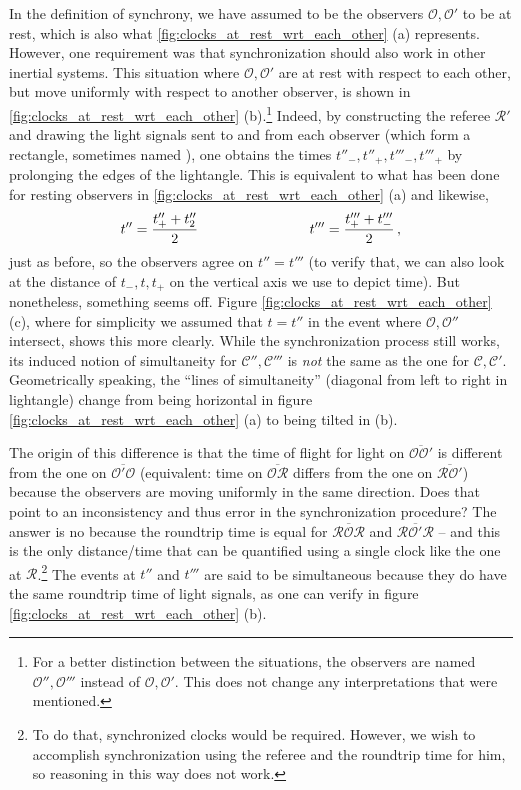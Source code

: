 In the definition of synchrony, we have assumed to be the observers $\mathcal{O}, \mathcal{O}'$ to be at rest, which is also what \ref{fig:clocks_at_rest_wrt_each_other} (a) represents. However, one requirement was that synchronization should also work in other inertial systems. This situation where $\mathcal{O}, \mathcal{O}'$ are at rest with respect to each other, but move uniformly with respect to another observer, is shown in \ref{fig:clocks_at_rest_wrt_each_other} (b).\footnote{For a better distinction between the situations, the observers are named $\mathcal{O}'', \mathcal{O}'''$ instead of $\mathcal{O}, \mathcal{O}'$. This does not change any interpretations that were mentioned.} Indeed, by constructing the referee $\mathcal{R}'$ and drawing the light signals sent to and from each observer (which form a rectangle, sometimes named ), one obtains the times $t''_-, t''_+, t'''_-, t'''_+$ by prolonging the edges of the lightangle. This is equivalent to what has been done for resting observers in \ref{fig:clocks_at_rest_wrt_each_other} (a) and likewise,
\begin{equation}
	t'' = \frac{t''_+ + t''_2}{2}
	\qquad \qquad \qquad \qquad
	t''' = \frac{t'''_+ + t'''_-}{2}
	\, ,
\end{equation}
just as before, so the observers agree on $ t'' = t'''$ (to verify that, we can also look at the distance of $t_-, t, t_+$ on the vertical axis we use to depict time). But nonetheless, something seems off. Figure \ref{fig:clocks_at_rest_wrt_each_other} (c), where for simplicity we assumed that $t = t''$ in the event where $\mathcal{O}, \mathcal{O}''$ intersect, shows this more clearly. While the synchronization process still works, its induced notion of simultaneity for $\mathcal{C}'', \mathcal{C}'''$ is \emph{not} the same as the one for $\mathcal{C}, \mathcal{C}'$. Geometrically speaking, the \enquote{lines of simultaneity} (diagonal from left to right in lightangle) change from being horizontal in figure \ref{fig:clocks_at_rest_wrt_each_other} (a) to being tilted in (b).


The origin of this difference is that the time of flight for light on $\overline{\mathcal{O} \mathcal{O}'}$ is different from the one on $\overline{\mathcal{O}' \mathcal{O}}$ (equivalent: time on $\overline{\mathcal{O} \mathcal{R}}$ differs from the one on $\overline{\mathcal{R} \mathcal{O}'}$) because the observers are moving uniformly in the same direction. Does that point to an inconsistency and thus error in the synchronization procedure? The answer is no because the roundtrip time is equal for $\overline{\mathcal{R} \mathcal{O} \mathcal{R}}$ and $\overline{\mathcal{R} \mathcal{O}' \mathcal{R}}$ -- and this is the only distance/time that can be quantified using a single clock like the one at $\mathcal{R}$.\footnote{To do that, synchronized clocks would be required. However,  we wish to accomplish synchronization using the referee and the roundtrip time for him, so reasoning in this way does not work.} The events at $t''$ and $t'''$ are said to be simultaneous because they do have the same roundtrip time of light signals, as one can verify in figure \ref{fig:clocks_at_rest_wrt_each_other} (b).



